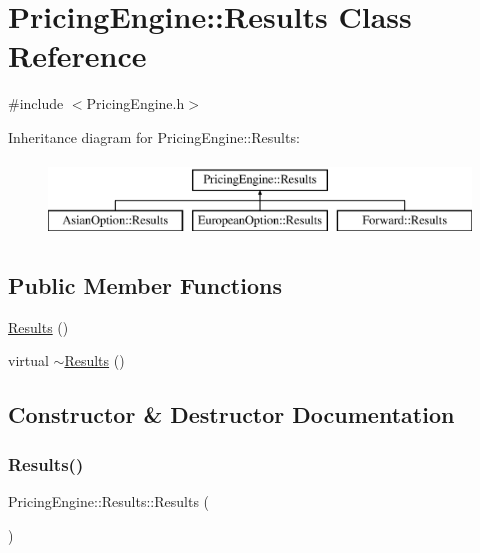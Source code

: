 \hypertarget{class_pricing_engine_1_1_results}{}\section{Pricing\+Engine\+:\+:Results Class Reference}
\label{class_pricing_engine_1_1_results}


{\ttfamily \#include $<$Pricing\+Engine.\+h$>$}

Inheritance diagram for Pricing\+Engine\+:\+:Results\+:\begin{figure}[H]
\begin{center}
\leavevmode
\includegraphics[height=2.000000cm]{class_pricing_engine_1_1_results}
\end{center}
\end{figure}
\subsection*{Public Member Functions}
\begin{DoxyCompactItemize}
\item 
\hyperlink{class_pricing_engine_1_1_results_a2bbf5c82ee43b77905a06659f26f3bf0}{Results} ()
\item 
virtual \hyperlink{class_pricing_engine_1_1_results_a3a0c59acadf917438c07697f547de53e}{$\sim$\+Results} ()
\end{DoxyCompactItemize}


\subsection{Constructor \& Destructor Documentation}
\hypertarget{class_pricing_engine_1_1_results_a2bbf5c82ee43b77905a06659f26f3bf0}{}\label{class_pricing_engine_1_1_results_a2bbf5c82ee43b77905a06659f26f3bf0} 
\subsubsection{\texorpdfstring{Results()}{Results()}}
{\footnotesize\ttfamily Pricing\+Engine\+::\+Results\+::\+Results (\begin{DoxyParamCaption}{ }\end{DoxyParamCaption})\hspace{0.3cm}{\ttfamily [inline]}}

